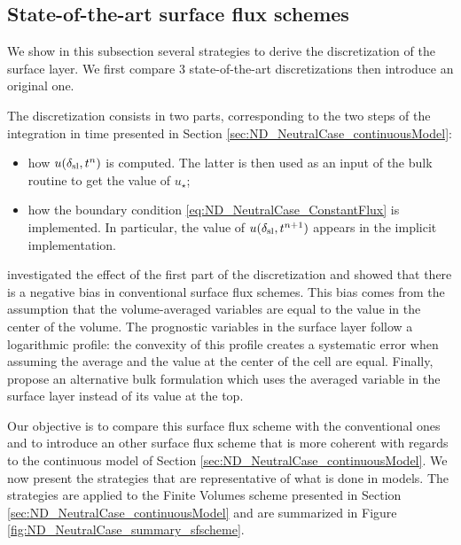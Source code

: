 \subsection{State-of-the-art surface flux schemes}
\label{sec:ND_NeutralCase_strategies}
We show in this subsection several strategies to derive the
discretization of the surface layer. We first compare 3
state-of-the-art discretizations then introduce an original one.
%
\par
The discretization consists in two parts, corresponding to the
two steps of the integration in time presented in Section
\ref{sec:ND_NeutralCase_continuousModel}:
\begin{itemize}
	\item how $u(\delta_{\rm sl}, t^n)$ is computed.
		The latter is then used as an input of the
		bulk routine to get the value of $u_\star$;
	\item how the boundary condition 
		\eqref{eq:ND_NeutralCase_ConstantFlux}
		is implemented. In particular,
		the value of $u(\delta_{\rm sl}, t^{n+1})$
		appears in the implicit implementation.
\end{itemize}
\cite{nishizawa_surface_2018} investigated the effect of the
first part of the discretization and showed that there is a
negative bias in conventional surface flux schemes. This
bias comes from the assumption that the
volume-averaged variables are equal to the value in the center
of the volume. The prognostic variables in the surface layer
follow a logarithmic profile: the convexity of this profile
creates a systematic error when assuming the average and the
value at the center of the cell are equal.
Finally, \citeauthor{nishizawa_surface_2018} propose an alternative
bulk formulation which uses the averaged variable in the surface layer
instead of its value at the top.
%
\par
Our objective is to compare this surface flux scheme with the
conventional ones
and to introduce an other surface flux scheme that is more coherent
with regards to the continuous model of Section
\ref{sec:ND_NeutralCase_continuousModel}.
We now present the strategies that are representative of
what is done in models. The strategies are applied to
the Finite Volumes scheme presented in Section
\ref{sec:ND_NeutralCase_continuousModel} and are
summarized in Figure \ref{fig:ND_NeutralCase_summary_sfscheme}.
